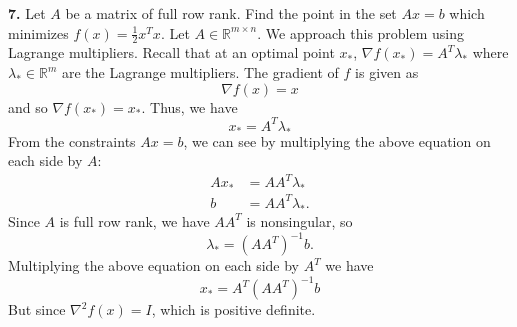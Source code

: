 \documentclass{article}
\begin{document}
\newline\newline\newline
\textbf{7.} Let $A$ be a matrix of full row rank. Find the point in the set $Ax = b$ which minimizes $f(x) = \frac{1}{2}x^Tx$. 
\newline\newline
Let $A \in \mathbb{R}^{m \times n}$. We approach this problem using Lagrange multipliers. Recall that at an optimal point $x_*$, $\nabla f(x_*) = A^T\lambda_*$ where $\lambda_* \in \mathbb{R}^m$ are the Lagrange multipliers. The gradient of $f$ is given as
\[\nabla f(x) = x\]
and so $\nabla f(x_*) = x_*$. Thus, we have 
\[x_* = A^T\lambda_*\]
From the constraints $Ax = b$, we can see by multiplying the above equation on each side by $A$:
\begin{align*}
    Ax_* &= AA^T\lambda_*\\
    b &= AA^T\lambda_*.
\end{align*}
Since $A$ is full row rank, we have $AA^T$ is nonsingular, so
\[\lambda_* = (AA^T)^{-1}b.\]
Multiplying the above equation on each side by $A^T$ we have 
\[x_* = A^T(AA^T)^{-1}b\]
But since $\nabla^2f(x) = I$, which is positive definite. 
\end{document}
